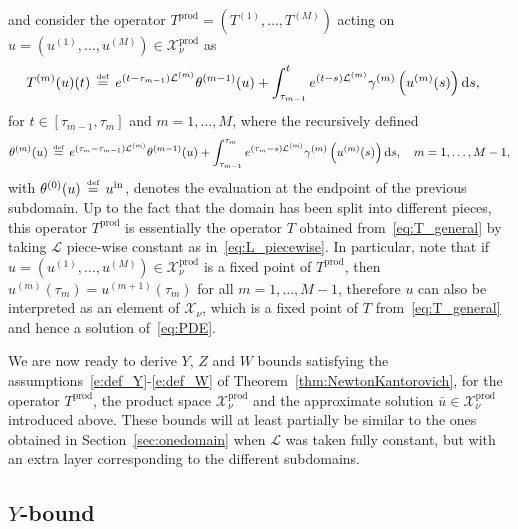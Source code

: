 \documentclass[10pt,a4paper]{article}
\theoremstyle{plain}
\renewcommand{\L}{\mathcal{L}}
\newcommand{\X}{\mathcal{X}}
\newcommand{\bu}{\bar{u}}
\newcommand{\1}{\mathbf{1}}
\renewcommand{\d}{\mathrm{d}}
\newcommand{\uin}{{u^{\mathrm{in}}}}
\newcommand{\ds}{\displaystyle}
\newcommand{\pprod}{\mathrm{prod}}
\newcommand{\bydef}{\,\stackrel{\mbox{\tiny\textnormal{\raisebox{0ex}[0ex][0ex]{def}}}}{=}\,}
\begin{document}
and consider the operator $T^\pprod= \left(T^{(1)},\ldots,T^{(M)}\right)$ acting on $u=\left(u^{(1)},\ldots,u^{(M)}\right)\in \X_\nu^\pprod$ as
\begin{align}
\label{eq:defTprod}
&T^{(m)}(u)(t) \bydef e^{(t-\tau_{m-1})\L^{(m)}}\theta^{(m-1)}(u) + \int_{\tau_{m-1}}^t e^{(t-s)\L^{(m)}} \gamma^{(m)} \left(u^{(m)}(s)\right) \d s, 
\end{align}
for $t\in[\tau_{m-1},\tau_{m}]$ and $m=1,\ldots,M$, 
where the recursively defined
\begin{align}
\label{eq:deftheta}
\ds \theta^{(m)}(u) \bydef e^{(\tau_{m}-\tau_{m-1})\L^{(m)}}\theta^{(m-1)}(u) + \int_{\tau_{m-1}}^{\tau_m}e^{(\tau_{m}-s)\L^{(m)}} \gamma^{(m)} \left(u^{(m)}(s)\right) \d s,\quad m=1,\ldots,M-1,
\end{align}
with $\theta^{(0)}(u) \bydef \uin$, denotes the evaluation at the endpoint of the previous subdomain.
Up to the fact that the domain has been split into different pieces, this operator $T^\pprod$ is essentially the operator $T$ obtained from~\eqref{eq:T_general} by taking $\L$ piece-wise constant as in~\eqref{eq:L_piecewise}. In particular, note that if $u=\left(u^{(1)},\ldots,u^{(M)}\right)\in \X_\nu^\pprod$ is a fixed point of $T^\pprod$, then $u^{(m)}(\tau_m) = u^{(m+1)}(\tau_m)$ for all $m=1,\ldots,M-1$, therefore $u$ can also be interpreted as an element of $\X_\nu$, which is a fixed point of $T$ from~\eqref{eq:T_general} and hence a solution of~\eqref{eq:PDE}.


\medskip

We are now ready to derive $Y$, $Z$ and $W$ bounds satisfying the assumptions~\eqref{e:def_Y}-\eqref{e:def_W} of Theorem~\ref{thm:NewtonKantorovich}, for the operator $T^\pprod$, the product space $\X_\nu^\pprod$ and the approximate solution $\bu\in \X_\nu^\pprod$ introduced above. These bounds will at least partially be similar to the ones obtained in Section~\ref{sec:onedomain} when $\L$ was taken fully constant, but with an extra layer corresponding to the different subdomains. 





\subsection{$Y$-bound}
\label{sec:Ybounds_DD}
\end{document}
